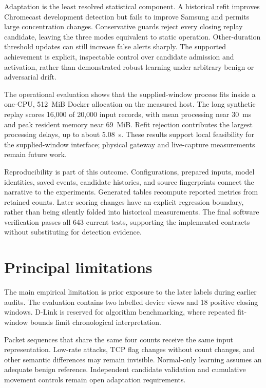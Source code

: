 Adaptation is the least resolved statistical component. A historical
refit improves Chromecast development detection but fails to improve
Samsung and permits large concentration changes. Conservative guards
reject every closing replay candidate, leaving the three modes
equivalent to static operation. Other-duration threshold updates
can still increase false alerts sharply. The supported achievement
is explicit, inspectable control over candidate admission and
activation, rather than demonstrated robust learning under arbitrary
benign or adversarial drift.

The operational evaluation shows that the supplied-window process
fits inside a one-CPU, 512~MiB Docker allocation on the measured host.
The long synthetic replay scores 16,000 of 20,000 input records,
with mean processing near 30~ms and peak resident memory near
69~MiB. Refit rejection contributes the largest processing delays,
up to about 5.08~s. These results support local feasibility for the
supplied-window interface; physical gateway and live-capture measurements
remain future work.

Reproducibility is part of this outcome. Configurations, prepared
inputs, model identities, saved events, candidate histories, and
source fingerprints connect the narrative to the experiments.
Generated tables recompute reported metrics from retained counts.
Later scoring changes have an explicit regression boundary, rather
than being silently folded into historical measurements. The final
software verification passes all 643 current tests, supporting the
implemented contracts without substituting for detection evidence.

\section{Principal limitations}

The main empirical limitation is prior exposure to the later labels during
earlier audits. The evaluation contains two labelled device views and
18 positive closing windows. D-Link is reserved for algorithm benchmarking,
where repeated fit-window bounds limit chronological interpretation.

Packet sequences that share the same four counts receive the same input
representation. Low-rate attacks, TCP flag changes without count changes,
and other semantic differences may remain invisible. Normal-only learning
assumes an adequate benign reference. Independent candidate validation and
cumulative movement controls remain open adaptation requirements.

